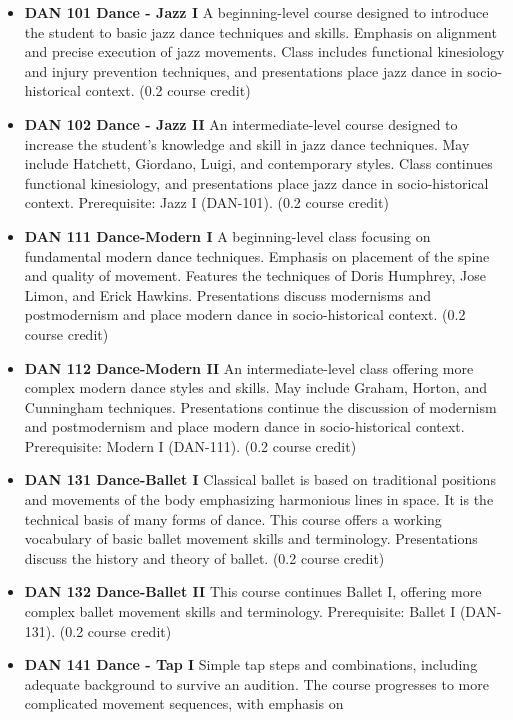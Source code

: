 \documentclass[
  letterpaper,
]{scrbook}
\providecommand{\tightlist}{%
  \setlength{\itemsep}{0pt}\setlength{\parskip}{0pt}}
\begin{document}
\begin{itemize}
\tightlist
\item
  \textbf{DAN 101 Dance - Jazz I} A beginning-level course designed to
  introduce the student to basic jazz dance techniques and skills.
  Emphasis on alignment and precise execution of jazz movements. Class
  includes functional kinesiology and injury prevention techniques, and
  presentations place jazz dance in socio-historical context. (0.2
  course credit)
\item
  \textbf{DAN 102 Dance - Jazz II} An intermediate-level course designed
  to increase the student's knowledge and skill in jazz dance
  techniques. May include Hatchett, Giordano, Luigi, and contemporary
  styles. Class continues functional kinesiology, and presentations
  place jazz dance in socio-historical context. Prerequisite: Jazz I
  (DAN-101). (0.2 course credit)
\item
  \textbf{DAN 111 Dance-Modern I} A beginning-level class focusing on
  fundamental modern dance techniques. Emphasis on placement of the
  spine and quality of movement. Features the techniques of Doris
  Humphrey, Jose Limon, and Erick Hawkins. Presentations discuss
  modernisms and postmodernism and place modern dance in
  socio-historical context. (0.2 course credit)
\item
  \textbf{DAN 112 Dance-Modern II} An intermediate-level class offering
  more complex modern dance styles and skills. May include Graham,
  Horton, and Cunningham techniques. Presentations continue the
  discussion of modernism and postmodernism and place modern dance in
  socio-historical context. Prerequisite: Modern I (DAN-111). (0.2
  course credit)
\item
  \textbf{DAN 131 Dance-Ballet I} Classical ballet is based on
  traditional positions and movements of the body emphasizing harmonious
  lines in space. It is the technical basis of many forms of dance. This
  course offers a working vocabulary of basic ballet movement skills and
  terminology. Presentations discuss the history and theory of ballet.
  (0.2 course credit)
\item
  \textbf{DAN 132 Dance-Ballet II} This course continues Ballet I,
  offering more complex ballet movement skills and terminology.
  Prerequisite: Ballet I (DAN-131). (0.2 course credit)
\item
  \textbf{DAN 141 Dance - Tap I} Simple tap steps and combinations,
  including adequate background to survive an audition. The course
  progresses to more complicated movement sequences, with emphasis on

\end{itemize}
\end{document}

